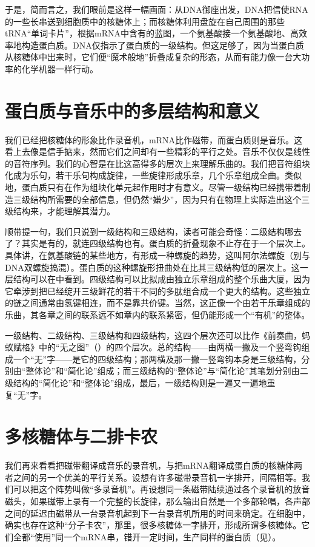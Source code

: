 于是，简而言之，我们眼前是这样一幅画面：从DNA御座出发，DNA把信使RNA的一些长串送到细胞质中的核糖体上；而核糖体利用盘旋在自己周围的那些tRNA“单词卡片”，根据mRNA中含有的蓝图，一个氨基酸接一个氨基酸地、高效率地构造蛋白质。DNA仅指示了蛋白质的一级结构。但这足够了，因为当蛋白质从核糖体中出来时，它们便“魔术般地”折叠成复杂的形态，从而有能力像一台大功率的化学机器一样行动。

\section{蛋白质与音乐中的多层结构和意义}

我们已经把核糖体的形象比作录音机，mRNA比作磁带，而蛋白质则是音乐。这看上去像是信手掂来，然而它们之间却有一些精彩的平行之处。音乐不仅仅是线性的音符序列。我们的心智是在比这高得多的层次上来理解乐曲的。我们把音符组块化成为乐句，若干乐句构成旋律，一些旋律形成乐章，几个乐章组成全曲。类似地，蛋白质只有在作为组块化单元起作用时才有意义。尽管一级结构已经携带着制造三级结构所需要的全部信息，但仍然“嫌少”，因为只有在物理上实际造出这个三级结构来，才能理解其潜力。

顺带提一句，我们只说到一级结构和三级结构，读者可能会奇怪：二级结构哪去了？其实是有的，就连四级结构也有。蛋白质的折叠现象不止存在于一个层次上。具体讲，在氨基酸链的某些地方，有形成一种螺旋的趋势，这叫阿尔法螺旋（别与DNA双螺旋搞混）。蛋白质的这种螺旋形扭曲处在比其三级结构低的层次上。这一层结构可以在中看到。四级结构可以比拟成由独立乐章组成的整个乐曲大厦，因为它牵涉到把已经绽开三级鲜花的若干不同的多肽组合成一个更大的结构。这些独立的链之间通常由氢键相连，而不是靠共价键。当然，这正像一个由若干乐章组成的乐曲，其各章之间的联系远不如章内的联系紧密，但仍能形成一个“有机”的整体。

一级结构、二级结构、三级结构和四级结构，这四个层次还可以比作《前奏曲，蚂蚁赋格》中的“无之图”（）的四个层次。总的结构——由两横一撇及一个竖弯钩组成一个“无”字——是它的四级结构；那两横及那一撇一竖弯钩本身是三级结构，分别由“整体论”和“简化论”组成；而三级结构的“整体论”与“简化论”其笔划分别由二级结构的“简化论”和“整体论”组成，最后，一级结构则是一遍又一遍地重复“无”字。

\section{多核糖体与二排卡农}

我们再来看看把磁带翻译成音乐的录音机，与把mRNA翻译成蛋白质的核糖体两者之间的另一个优美的平行关系。设想有许多磁带录音机一字排开，间隔相等。我们可以把这个阵势叫做“多录音机”。再设想同一条磁带陆续通过各个录音机的放音磁头，如果磁带上录有一个完整的长旋律，那么输出自然是一个多部轮唱，各声部之间的延迟由磁带从一台录音机起到下一台录音机所用的时间来确定。在细胞中，确实也存在这种“分子卡农”，那里，很多核糖体一字排开，形成所谓多核糖体。它们全都“使用”同一个mRNA串，错开一定时间，生产同样的蛋白质（见）。

